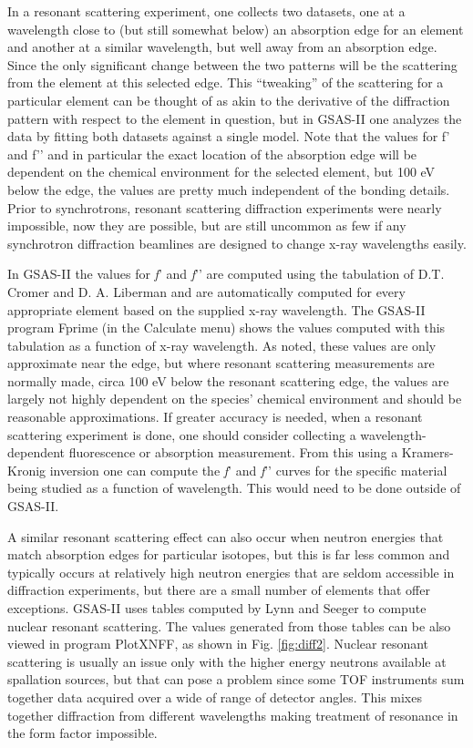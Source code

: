 In a resonant scattering experiment, one collects two datasets, one at a wavelength close to (but still somewhat below) an absorption edge for an element and another at a similar wavelength, but well away from an absorption edge. Since the only significant change between the two patterns will be the scattering from the element at this selected edge. This “tweaking” of the scattering for a particular element can be thought of as akin to the derivative of the diffraction pattern with respect to the element in question, but in GSAS-II one analyzes the data by fitting both datasets against a single model. Note that the values for f’ and f’’ and in particular the exact location of the absorption edge will be dependent on the chemical environment for the selected element, but 100 eV below the edge, the values are pretty much independent of the bonding details. 
Prior to synchrotrons, resonant scattering diffraction experiments were nearly impossible, now they are possible, but are still uncommon as few if any synchrotron diffraction beamlines are designed to change x-ray wavelengths easily. 

 In GSAS-II the values for \textit{f}’ and \textit{f}’’ are computed using the tabulation of D.T. Cromer and D. A. Liberman and are automatically computed for every appropriate element based on the supplied x-ray wavelength. The GSAS-II program Fprime (in the Calculate menu) shows the values computed with this tabulation as a function of x-ray wavelength. As noted, these values are only approximate near the edge, but where resonant scattering measurements are normally made, circa 100 eV below the resonant scattering edge, the values are largely not highly dependent on the species’ chemical environment and should be reasonable approximations. If greater accuracy is needed, when a resonant scattering experiment is done, one should consider collecting a wavelength-dependent fluorescence or absorption measurement. From this using a Kramers-Kronig inversion one can compute the \textit{f}’ and \textit{f}’’ curves for the specific material being studied as a function of wavelength. This would need to be done outside of GSAS-II. 

 A similar resonant scattering effect can also occur when neutron energies that match absorption edges for particular isotopes, but this is far less common and typically occurs at relatively high neutron energies that are seldom accessible in diffraction experiments, but there are a small number of elements that offer exceptions. GSAS-II uses tables computed by Lynn and Seeger to compute nuclear resonant scattering. The values generated from those tables can be also viewed in program PlotXNFF, as shown in Fig. \ref{fig:diff2}. Nuclear resonant scattering is usually an issue only with the higher energy neutrons available at spallation sources, but that can pose a problem since some TOF instruments sum together data acquired over a wide of range of detector angles. This mixes together diffraction from different wavelengths making treatment of resonance in the form factor impossible. 

